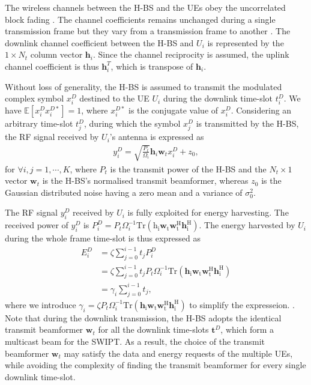 \documentclass[12pt,draftcls,onecolumn,journal]{IEEEtran}
\begin{document}
The wireless channels between the H-BS and the UEs obey the uncorrelated block fading \cite{access_3}. The channel coefficients remains unchanged during a single transmission frame but they vary from a transmission frame to another \cite{access_4}. The downlink channel coefficient between the H-BS and $U_i$ is represented by the $1\times N_t$ column vector $\mathbf{h}_i$. Since the channel reciprocity is assumed, the uplink channel coefficient is thus $\mathbf{h}_i^T$, which is transpose of $\mathbf{h}_i$.


Without loss of generality, the H-BS is assumed to transmit the modulated complex symbol $x_i^D$ destined to the UE $U_i$ during the downlink time-slot $t_i^D$. We have $\mathbb{E}[x_i^Dx_i^{D*}] = 1$, where $x_i^{D*}$ is the conjugate value of $x_i^D$. Considering an arbitrary time-slot $t_j^D$, during which the symbol $x_j^D$ is transmitted by the H-BS, the RF signal received by $U_i$'s antenna is expressed as
\begin{align}
y_{i}^D = \sqrt{\frac{P_t}{\Omega_i}}\mathbf{h}_i\mathbf{w}_tx_i^D + z_0,
\end{align}
for $\forall i,j=1,\cdots,K$, where $P_t$ is the transmit power of the H-BS and the $N_t\times 1$ vector $\mathbf{w}_t$ is the H-BS's normalised transmit beamformer, whereas $z_0$ is the Gaussian distributed noise having a zero mean and a variance of $\sigma_0^2$.


The RF signal $y_{i}^D$ received by $U_i$ is fully exploited for energy harvesting. The received power of $y_{i}^D$ is $P_{i}^D = P_t \Omega_i^{-1} \boldsymbol{\mathrm{Tr({h}_i\mathbf{w}_t\mathbf{w}_t^H\mathbf{h}_i^H)}}$. The energy harvested by $U_i$ during the whole frame time-slot is thus expressed as
\begin{align}
E_{i}^D & = \zeta \sum_{j=0}^{i-1}t_{j}P_{i}^D \\
&=\zeta \sum_{j=0}^{i-1}t_{j}P_t \Omega_i^{-1} \boldsymbol{\mathrm {Tr(\mathbf{h}_i\mathbf{w}_t\mathbf{w}_t^H\mathbf{h}_i^H)}} \\
&=\gamma_i\sum_{j=0}^{i-1}t_{j},
\end{align}
where we introduce $\gamma_i=\zeta P_t\Omega_i^{-1}\boldsymbol{\mathrm{Tr(\mathbf{h}_i\mathbf{w}_t\mathbf{w}_t^H\mathbf{h}_i^H)}}$ to simplify the expresseion. \cbend. Note that during the downlink transmission, the H-BS adopts the identical transmit beamformer $\mathbf{w}_t$ for all the downlink time-slots $\mathbf{t}^D$, which form a multicast beam for the SWIPT. As a result, the choice of the transmit beamformer $\mathbf{w}_t$ may satisfy the data and energy requests of the multiple UEs, while avoiding the complexity of finding the transmit beamformer for every single downlink time-slot.
\end{document}
